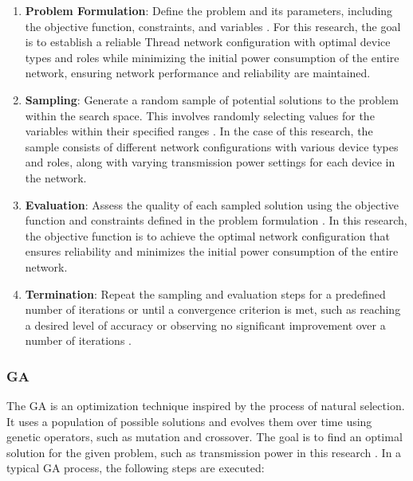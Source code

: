 \begin{enumerate}
    \item \textbf{Problem Formulation}: Define the problem and its parameters, including the objective function, constraints, and variables \cite{kroese2014monte}. For this research, the goal is to establish a reliable Thread network configuration with optimal device types and roles while minimizing the initial power consumption of the entire network, ensuring network performance and reliability are maintained.
    \item \textbf{Sampling}: Generate a random sample of potential solutions to the problem within the search space. This involves randomly selecting values for the variables within their specified ranges \cite{kroese2014monte}. In the case of this research, the sample consists of different network configurations with various device types and roles, along with varying transmission power settings for each device in the network.
    \item \textbf{Evaluation}: Assess the quality of each sampled solution using the objective function and constraints defined in the problem formulation \cite{kroese2014monte}. In this research, the objective function is to achieve the optimal network configuration that ensures reliability and minimizes the initial power consumption of the entire network.
    \item \textbf{Termination}: Repeat the sampling and evaluation steps for a predefined number of iterations or until a convergence criterion is met, such as reaching a desired level of accuracy or observing no significant improvement over a number of iterations \cite{kroese2014monte}.
\end{enumerate}


\subsubsection{\acrlong{GA}}

The \acrfull{GA} is an optimization technique inspired by the process of natural selection. It uses a population of possible solutions and evolves them over time using genetic operators, such as mutation and crossover. The goal is to find an optimal solution for the given problem, such as transmission power in this research \cite{lambora2019genetic}. In a typical \gls{GA} process, the following steps are executed:

